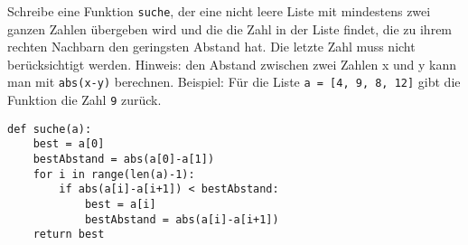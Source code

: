 \question[4]
Schreibe eine Funktion \texttt{suche}, der eine nicht leere Liste mit mindestens
zwei ganzen Zahlen übergeben wird und die die Zahl in der Liste findet, die
zu ihrem rechten Nachbarn den geringsten Abstand hat. Die letzte
Zahl muss nicht berücksichtigt werden.
Hinweis: den Abstand zwischen zwei Zahlen x und y kann man mit \texttt{abs(x-y)} berechnen.
Beispiel: Für die Liste \texttt{a = [4, 9, 8, 12]} gibt die Funktion
die Zahl \texttt{9} zurück.

\begin{solutionbox}{9cm}
\begin{lstlisting}
def suche(a):
    best = a[0]
    bestAbstand = abs(a[0]-a[1])
    for i in range(len(a)-1):
        if abs(a[i]-a[i+1]) < bestAbstand:
            best = a[i]
            bestAbstand = abs(a[i]-a[i+1])
    return best
\end{lstlisting}
\end{solutionbox}
